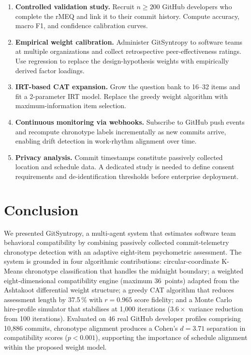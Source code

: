 \documentclass[conference]{IEEEtran}
\begin{document}
\begin{enumerate}
  \item \textbf{Controlled validation study.}  Recruit $n \geq 200$
    GitHub developers who complete the rMEQ and link it to their
    commit history.  Compute accuracy, macro F1, and confidence
    calibration curves.

  \item \textbf{Empirical weight calibration.}  Administer
    GitSyntropy to software teams at multiple organizations and
    collect retrospective peer-effectiveness ratings.  Use
    regression to replace the design-hypothesis weights with
    empirically derived factor loadings.

  \item \textbf{IRT-based CAT expansion.}  Grow the question bank
    to 16--32 items and fit a 2-parameter IRT model.  Replace the
    greedy weight algorithm with maximum-information item selection.

  \item \textbf{Continuous monitoring via webhooks.}  Subscribe to
    GitHub push events and recompute chronotype labels incrementally
    as new commits arrive, enabling drift detection in work-rhythm
    alignment over time.

  \item \textbf{Privacy analysis.}  Commit timestamps constitute
    passively collected location and schedule data.  A dedicated
    study is needed to define consent requirements and
    de-identification thresholds before enterprise deployment.
\end{enumerate}

\section{Conclusion}
\label{sec:conclusion}

We presented GitSyntropy, a multi-agent system that estimates software
team behavioral compatibility by combining passively collected
commit-telemetry chronotype detection with an adaptive eight-item
psychometric assessment.  The system is grounded in four algorithmic
contributions: circular-coordinate K-Means chronotype classification
that handles the midnight boundary; a weighted eight-dimensional
compatibility engine (maximum 36~points) adapted from the Ashtakoot
differential weight structure; a greedy CAT algorithm that reduces
assessment length by 37.5\,\% with $r = 0.965$ score fidelity; and
a Monte Carlo hire-profile simulator that stabilises at 1,000
iterations ($3.6\times$ variance reduction from 100 iterations).
Evaluated on 46 real GitHub developer profiles comprising 10,886
commits, chronotype alignment produces a Cohen's $d = 3.71$
separation in compatibility scores ($p < 0.001$), supporting the
importance of schedule alignment within the proposed weight model.
\end{document}
